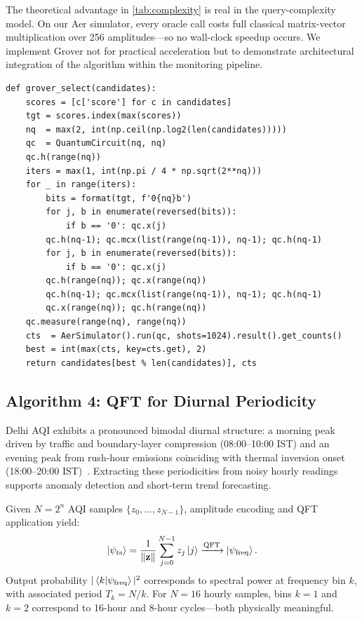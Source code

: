 \documentclass[conference]{IEEEtran}
\begin{document}
The theoretical advantage in \cref{tab:complexity} is real in the
query-complexity model.
On our Aer simulator, every oracle call costs full classical matrix-vector
multiplication over 256 amplitudes---so no wall-clock speedup occurs.
We implement Grover not for practical acceleration but to demonstrate
architectural integration of the algorithm within the monitoring pipeline.

\begin{lstlisting}[caption={Grover's station selection.},
  label=lst:grover, float=t]
def grover_select(candidates):
    scores = [c['score'] for c in candidates]
    tgt = scores.index(max(scores))
    nq  = max(2, int(np.ceil(np.log2(len(candidates)))))
    qc  = QuantumCircuit(nq, nq)
    qc.h(range(nq))
    iters = max(1, int(np.pi / 4 * np.sqrt(2**nq)))
    for _ in range(iters):
        bits = format(tgt, f'0{nq}b')
        for j, b in enumerate(reversed(bits)):
            if b == '0': qc.x(j)
        qc.h(nq-1); qc.mcx(list(range(nq-1)), nq-1); qc.h(nq-1)
        for j, b in enumerate(reversed(bits)):
            if b == '0': qc.x(j)
        qc.h(range(nq)); qc.x(range(nq))
        qc.h(nq-1); qc.mcx(list(range(nq-1)), nq-1); qc.h(nq-1)
        qc.x(range(nq)); qc.h(range(nq))
    qc.measure(range(nq), range(nq))
    cts  = AerSimulator().run(qc, shots=1024).result().get_counts()
    best = int(max(cts, key=cts.get), 2)
    return candidates[best % len(candidates)], cts
\end{lstlisting}


\subsection{Algorithm 4: QFT for Diurnal Periodicity}\label{subsec:qft_alg}

Delhi AQI exhibits a pronounced bimodal diurnal structure: a morning
peak driven by traffic and boundary-layer compression (08:00--10:00 IST)
and an evening peak from rush-hour emissions coinciding with thermal
inversion onset (18:00--20:00 IST)~\cite{pant2013estimation,balakrishnan2019impact}.
Extracting these periodicities from noisy hourly readings supports
anomaly detection and short-term trend forecasting.

Given $N = 2^n$ AQI samples $\{z_0, \ldots, z_{N-1}\}$, amplitude
encoding and QFT application yield:
\begin{equation}\label{eq:ts_encode}
\ket{\psi_{\mathrm{ts}}} = \frac{1}{\|\mathbf{z}\|}\sum_{j=0}^{N-1}
z_j\ket{j}
\xrightarrow{\mathrm{QFT}} \ket{\psi_{\mathrm{freq}}}.
\end{equation}
Output probability $|\braket{k|\psi_{\mathrm{freq}}}|^2$ corresponds to
spectral power at frequency bin $k$, with associated period $T_k = N/k$.
For $N = 16$ hourly samples, bins $k = 1$ and $k = 2$ correspond to
16-hour and 8-hour cycles---both physically meaningful.
\end{document}
